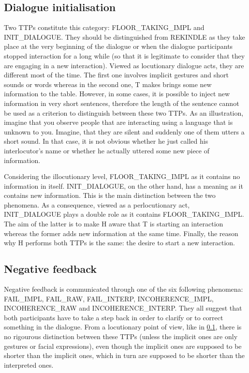 
    \subsection{Dialogue initialisation}
    \label{tax:dialinit}
		
         Two TTPs constitute this category: FLOOR\_TAKING\_IMPL and INIT\_DIALOGUE. They should be distinguished from REKINDLE as they take place at the very beginning of the dialogue or when the dialogue participants stopped interaction for a long while (so that it is legitimate to consider that they are engaging in a new interaction). Viewed as locutionary dialogue acts, they are different most of the time. The first one involves implicit gestures and short sounds or words whereas in the second one, T makes brings some new information to the table. However, in some cases, it is possible to inject new information in very short sentences, therefore the length of the sentence cannot be used as a criterion to distinguish between these two TTPs. As an illustration, imagine that you observe people that are interacting using a language that is unknown to you. Imagine, that they are silent and suddenly one of them utters a short sound. In that case, it is not obvious whether he just called his interlocutor's name or whether he actually uttered some new piece of information.
			
	 Considering the illocutionary level, FLOOR\_TAKING\_IMPL as it contains no information in itself. INIT\_DIALOGUE, on the other hand, has a meaning as it contains new information. This is the main distinction between the two phenomena. As a consequence, viewed as a perlocutionary act, INIT\_DIALOGUE plays a double role as it contains FLOOR\_TAKING\_IMPL. The aim of the latter is to make H aware that T is starting an interaction whereas the former adds new information at the same time. Finally, the reason why H performs both TTPs is the same: the desire to start a new interaction.               

    \subsection{Negative feedback}

         Negative feedback is communicated through one of the six following phenomena: FAIL\_IMPL, FAIL\_RAW, FAIL\_INTERP, INCOHERENCE\_IMPL, INCOHERENCE\_RAW and INCOHERENCE\_INTERP. They all suggest that both participants have to take a step back in order to clarify or to correct something in the dialogue. From a locutionary point of view, like in \ref{tax:dialinit}, there is no rigourous distinction between these TTPs (unless the implicit ones are only gestures or facial expressions), even though the implicit ones are supposed to be shorter than the implicit ones, which in turn are supposed to be shorter than the interpreted ones.

